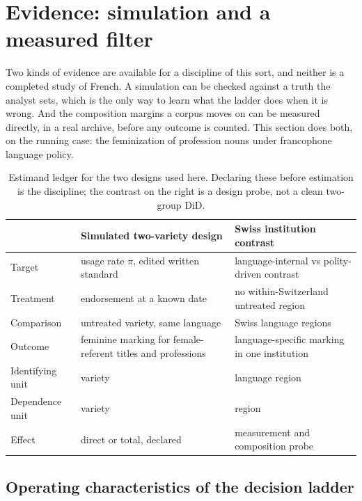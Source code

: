 \section{Evidence: simulation and a measured filter}
\label{sec:worked}
\FloatBarrier

Two kinds of evidence are available for a discipline of this sort, and neither is a completed study of French. A simulation can be checked against a truth the analyst sets, which is the only way to learn what the ladder does when it is wrong. And the composition margins a corpus moves on can be measured directly, in a real archive, before any outcome is counted. This section does both, on the running case: the feminization of profession nouns under francophone language policy.

\begin{table}[t]
\centering
\footnotesize
\caption{Estimand ledger for the two designs used here. Declaring these before estimation is the discipline; the contrast on the right is a design probe, not a clean two-group DiD.}
\label{tab:ledger}
\begin{tabular}{@{}l p{} p{}@{}}
\toprule
 & \textbf{Simulated two-variety design} & \textbf{Swiss institution contrast} \\
\midrule
Target & usage rate $\pi$, edited written standard & language-internal vs polity-driven contrast \\
Treatment & endorsement at a known date & no within-Switzerland untreated region \\
Comparison & untreated variety, same language & Swiss language regions \\
Outcome & feminine marking for female-referent titles and professions & language-specific marking in one institution \\
Identifying unit & variety & language region \\
Dependence unit & variety & region \\
Effect & direct or total, declared & measurement and composition probe \\
\bottomrule
\end{tabular}
\end{table}



\subsection{Operating characteristics of the decision ladder}

